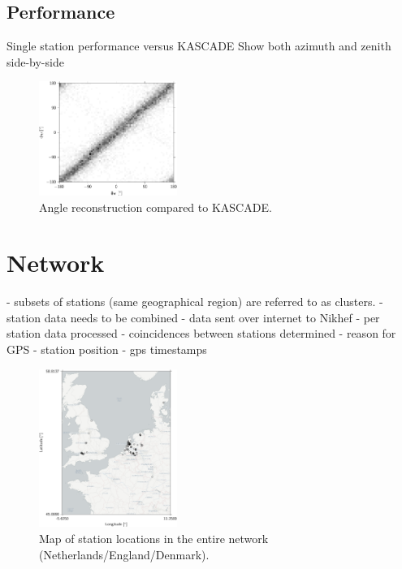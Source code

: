 \subsection{Performance}

Single station performance versus KASCADE
Show both azimuth and zenith side-by-side

\begin{figure}
    \centering
    \includegraphics[width=0.4\textwidth]
                    {plots/experiment/azimuth_kascade_minn1}
    \caption{Angle reconstruction compared to KASCADE.}
    \label{fig:azimuth_kascade}
\end{figure}


\section{Network}
\label{sec:network-design}

- subsets of stations (same geographical region) are referred to as clusters.
- station data needs to be combined
- data sent over internet to Nikhef
    - per station data processed
    - coincidences between stations determined
- reason for GPS
    - station position
    - gps timestamps



\begin{figure}
    \centering
    \includegraphics[width=0.4\textwidth]{plots/experiment/network}
    \caption{Map of station locations in the entire \hisparc network (Netherlands/England/Denmark).}
    \label{fig:network-map}
\end{figure}

